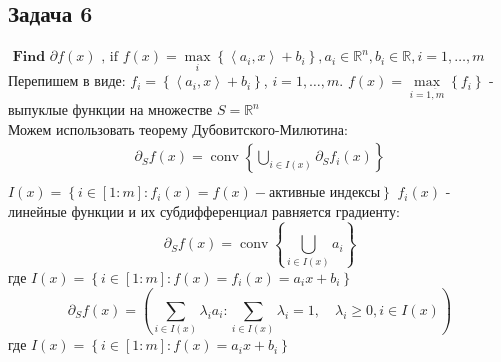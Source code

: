 \documentclass[12pt,letterpaper]{article}
\begin{document}
\subsection*{Задача 6}
$
\textbf { Find } \partial f(x) \text { , if } f(x)=\max\limits _{i}\left\{\left\langle a_{i}, x\right\rangle+b_{i}\right\}, a_{i} \in \mathbb{R}^{n}, b_{i} \in \mathbb{R}, i=1, \ldots, m
$\\

Перепишем в виде: $ f_i = \left\{\left\langle a_{i}, x\right\rangle+b_{i}\right\} $, $ i=1, \ldots, m $. $ f(x) = \max\limits _{i = \overline{1,m}}\left\{ f_i \right\}$ - выпуклые функции на множестве $ S = \mathbb{R}^n $\\
Можем использовать теорему Дубовитского-Милютина:
$$
\begin{array}{l}
\partial_{S} f\left(x\right)=\operatorname{conv}\left\{\bigcup_{i \in I\left(x\right)} \partial_{S} f_{i}\left(x\right)\right\} \\
\end{array}
$$
$I(x)=\left\{i \in[1: m]: f_{i}(x)=f(x) - \text{активные индексы}\right\}$
$ f_i(x) $ - линейные функции и их субдифференциал равняется градиенту: 
$$
\partial_{S} f\left(x\right)=\operatorname{conv}\left\{\bigcup_{i \in I\left(x\right)} a_i\right\}
$$
где $ I(x)=\left\{i \in[1: m]: f(x)=f_{i}(x)= a_i x + b_i \right\} $
$$
\partial_{S} f\left(x\right) = \left(\sum_{i \in I(x)} \lambda_{i} a_{i}: \sum_{i \in I(x)} \lambda_{i}=1, \quad \lambda_{i} \geq 0, i \in I(x)\right)
$$
где $ I(x)=\left\{i \in[1: m]: f(x)= a_i x + b_i \right\} $
\end{document}
